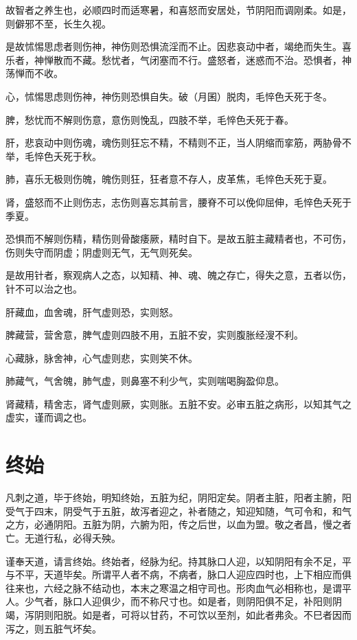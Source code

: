 \documentclass[a4paper,12pt,UTF8,twoside]{ctexbook}
\begin{document}
	故智者之养生也，必顺四时而适寒暑，和喜怒而安居处，节阴阳而调刚柔。如是，则僻邪不至，长生久视。
	
	是故怵惕思虑者则伤神，神伤则恐惧流淫而不止。因悲哀动中者，竭绝而失生。喜乐者，神惮散而不藏。愁忧者，气闭塞而不行。盛怒者，迷惑而不治。恐惧者，神荡惮而不收。
	
	心，怵惕思虑则伤神，神伤则恐惧自失。破（月囷）脱肉，毛悴色夭死于冬。
	
	脾，愁忧而不解则伤意，意伤则悗乱，四肢不举，毛悴色夭死于春。
	
	肝，悲哀动中则伤魂，魂伤则狂忘不精，不精则不正，当人阴缩而挛筋，两胁骨不举，毛悴色夭死于秋。
	
	肺，喜乐无极则伤魄，魄伤则狂，狂者意不存人，皮革焦，毛悴色夭死于夏。
	
	肾，盛怒而不止则伤志，志伤则喜忘其前言，腰脊不可以俛仰屈伸，毛悴色夭死于季夏。
	
	恐惧而不解则伤精，精伤则骨酸痿厥，精时自下。是故五脏主藏精者也，不可伤，伤则失守而阴虚；阴虚则无气，无气则死矣。
	
	是故用针者，察观病人之态，以知精、神、魂、魄之存亡，得失之意，五者以伤，针不可以治之也。
	
	肝藏血，血舍魂，肝气虚则恐，实则怒。
	
	脾藏营，营舍意，脾气虚则四肢不用，五脏不安，实则腹胀经溲不利。
	
	心藏脉，脉舍神，心气虚则悲，实则笑不休。
	
	肺藏气，气舍魄，肺气虚，则鼻塞不利少气，实则喘喝胸盈仰息。
	
	肾藏精，精舍志，肾气虚则厥，实则胀。五脏不安。必审五脏之病形，以知其气之虚实，谨而调之也。
	
	\chapter{终始}
	
	凡刺之道，毕于终始，明知终始，五脏为纪，阴阳定矣。阴者主脏，阳者主腑，阳受气于四末，阴受气于五脏，故泻者迎之，补者随之，知迎知随，气可令和，和气之方，必通阴阳。五脏为阴，六腑为阳，传之后世，以血为盟。敬之者昌，慢之者亡。无道行私，必得夭殃。
	
	谨奉天道，请言终始。终始者，经脉为纪。持其脉口人迎，以知阴阳有余不足，平与不平，天道毕矣。所谓平人者不病，不病者，脉口人迎应四时也，上下相应而俱往来也，六经之脉不结动也，本末之寒温之相守司也。形肉血气必相称也，是谓平人。少气者，脉口人迎俱少，而不称尺寸也。如是者，则阴阳俱不足，补阳则阴竭，泻阴则阳脱。如是者，可将以甘药，不可饮以至剂，如此者弗灸。不巳者因而泻之，则五脏气坏矣。
	
\end{document}
